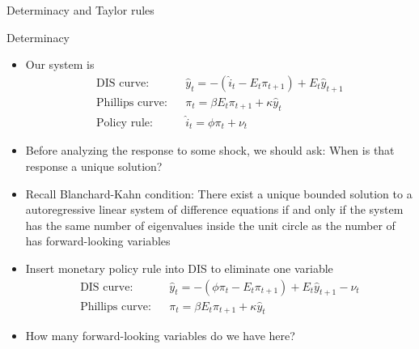 \documentclass[9pt,xcolor={dvipsnames}]{beamer}
\newcommand{\bit}{\begin{itemize}}
\newcommand{\eit}{\end{itemize}}
\newcommand{\bc}{\color{blue}}
\begin{document}
\begin{frame}

\begin{center}
	\huge Determinacy and Taylor rules \normalfont
\end{center}

\end{frame}


\begin{frame}{Determinacy}

\bit
\setlength\itemsep{1em}
\item Our system is
\begin{eqnarray}
\text{DIS curve:} && \hat y_t = - (\hat i_t-E_t \pi_{t+1}) + E_t \hat y_{t+1} \nonumber \\
\text{Phillips curve:} && \pi_t = \beta E_t \pi_{t+1} + \kappa \hat y_t \nonumber \\
\text{Policy rule:} && \hat i_t = \phi \pi_t + \nu_t \nonumber 
\end{eqnarray}

\item Before analyzing the response to some shock, we should ask: When is that response a unique solution?


\item Recall Blanchard-Kahn condition: There exist a {\bc unique bounded solution} to a autoregressive linear system of difference equations if and only if the system {\bc has the same number of eigenvalues inside the unit circle as the number of has forward-looking variables}

\item Insert monetary policy rule into DIS to eliminate one variable
\begin{eqnarray}
\text{DIS curve:} && \hat y_t = - (\phi \pi_t -E_t \pi_{t+1}) + E_t \hat y_{t+1} - \nu_t \nonumber \\
\text{Phillips curve:} && \pi_t = \beta E_t \pi_{t+1} + \kappa \hat y_t \nonumber 
\end{eqnarray}

\item How many forward-looking variables do we have here?

\eit

\end{frame}
\end{document}
